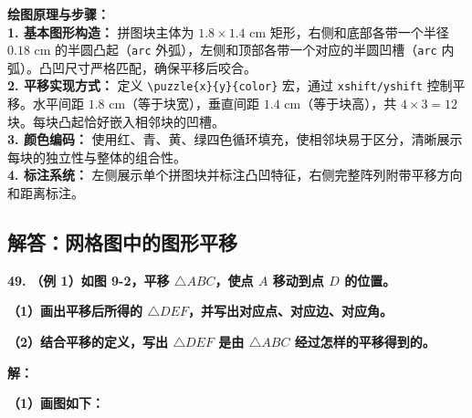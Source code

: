 \vspace{0.4cm}
{\small\color{blue!70!black}
\textbf{绘图原理与步骤：}\\
\textbf{1. 基本图形构造：} 拼图块主体为 $1.8 \times 1.4$ cm 矩形，右侧和底部各带一个半径 $0.18$ cm 的半圆凸起（\texttt{arc} 外弧），左侧和顶部各带一个对应的半圆凹槽（\texttt{arc} 内弧）。凸凹尺寸严格匹配，确保平移后咬合。\\
\textbf{2. 平移实现方式：} 定义 \texttt{\textbackslash{}puzzle\{x\}\{y\}\{color\}} 宏，通过 \texttt{xshift/yshift} 控制平移。水平间距 $1.8$ cm（等于块宽），垂直间距 $1.4$ cm（等于块高），共 $4 \times 3 = 12$ 块。每块凸起恰好嵌入相邻块的凹槽。\\
\textbf{3. 颜色编码：} 使用红、青、黄、绿四色循环填充，使相邻块易于区分，清晰展示每块的独立性与整体的组合性。\\
\textbf{4. 标注系统：} 左侧展示单个拼图块并标注凸凹特征，右侧完整阵列附带平移方向和距离标注。
}
\newpage

\newpage

\subsection{解答：网格图中的图形平移}

\vspace{0.6cm}

\textbf{\LARGE 49.} \textbf{（例 1）如图 9-2，平移 $\triangle ABC$，使点 $A$ 移动到点 $D$ 的位置。}

\textbf{（1）画出平移后所得的 $\triangle DEF$，并写出对应点、对应边、对应角。}

\textbf{（2）结合平移的定义，写出 $\triangle DEF$ 是由 $\triangle ABC$ 经过怎样的平移得到的。}

\vspace{0.4cm}
\textbf{解：}

\textbf{（1）画图如下：}

